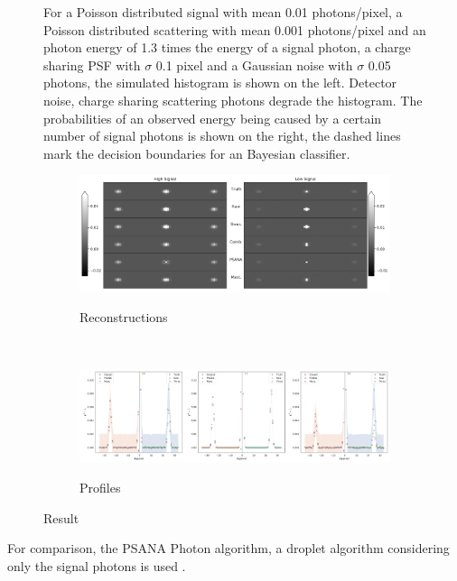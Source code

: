 \begin{figure}
	\caption[Histogram, probabilities and decision boundaries for the photon number]{For a Poisson distributed signal with mean 0.01 photons/pixel, a Poisson distributed scattering with mean 0.001 photons/pixel and an photon energy of 1.3 times the energy of a signal photon, a charge sharing PSF with $\sigma$ 0.1 pixel and a Gaussian noise with $\sigma$ 0.05 photons, the simulated histogram is shown on the left. Detector noise, charge sharing scattering photons degrade the histogram. The probabilities of an observed energy being caused by a certain number of signal photons is shown on the right, the dashed lines mark the decision boundaries for an Bayesian classifier.} 
\end{figure}


\begin{figure}
	\centering
	\begin{subfigure}[b]{0.85\textwidth}
		\includegraphics[width=\linewidth]{images/photonreconimg.pdf}
		\label{fig:photonreconimg}
		\caption{Reconstructions}
	\end{subfigure}
\\
	\begin{subfigure}[b]{0.95\textwidth}
		\includegraphics[width=\linewidth]{images/photonrecon.pdf}
		\label{fig:photonrecon}
		\caption{Profiles}
	\end{subfigure}	
	
	\caption{Result} 
\end{figure}





For comparison, the PSANA Photon algorithm, a droplet algorithm considering only the signal photons is used \cite{psana}.

